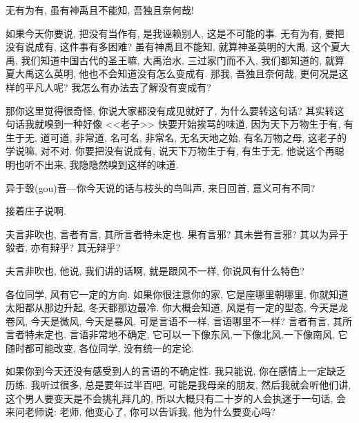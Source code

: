 \documentclass[11pt]{article}
\begin{document}
\newpage 

{\begin{center}
		{\color{green} 无有为有, 虽有神禹且不能知, 吾独且奈何哉!}
\end{center}}

\vspace{-0.5cm}

如果今天你要说, 把没有当作有, 是我诬赖别人, 这是不可能的事. {\color{blue} 无有为有,} 要把没有说成有, 这件事有多困难? {\color{blue} 虽有神禹且不能知},  就算神圣英明的大禹, 这个夏大禹, 我们知道中国古代的圣王嘛, 大禹治水, 三过家门而不入, 我们都知道的, 就算夏大禹这么英明, 他也不会知道没有怎么变成有. 那我, {\color{blue} 吾独且奈何哉}, 更何况是这样的平凡人呢? 我怎么有办法去了解没有变成有?

那你这里觉得很奇怪, 你说大家都没有成见就好了, 为什么要转这句话? 其实转这句话我就嗅到一种好像 <<老子>> 快要开始挨骂的味道, 因为天下万物生于有, 有生于无, 道可道, 非常道, 名可名, 非常名, 无名天地之始, 有名万物之母, 这老子的学说嘛, 对不对. 你要把没有说成有, 说天下万物生于有, 有生于无, 他说这个再聪明也听不出来, 我隐隐然嗅到这样的味道. 

\vspace{0.25cm}

{\Large \color{purple} 异于彀(gou)音---你今天说的话与枝头的鸟叫声, 来日回首, 意义可有不同? }

\vspace{-0.25cm}

接着庄子说啊.

\vspace{-0.25cm}

{\begin{center}
		{\color{green} 夫言非吹也, 言者有言, 其所言者特未定也. 果有言邪? 其未尝有言邪? 其以为异于彀者, 亦有辩乎? 其无辩乎? }
\end{center}}

\vspace{-0.5cm}

{\color{blue} 夫言非吹也}, 他说, 我们讲的话啊, 就是跟风不一样, 你说风有什么特色?    

各位同学, 风有它一定的方向. 如果你很注意你的家, 它是座哪里朝哪里, 你就知道太阳都从那边升起, 冬天都那边最冷. 你大概会知道, 风是有一定的型态, 今天是龙卷风, 今天是微风, 今天是暴风, 可是言语不一样, 言语哪里不一样? {\color{blue} 言者有言, 其所言者特未定也.} 言语非常地不确定, 它可以一下像东风,一下像北风,一下像南风, 它随时都可能改变, 各位同学, 没有统一的定论.

如果你到今天还没有感受到人的言语的不确定性. 我只能说, 你在感情上一定缺乏历练. 我听过很多, 总是要年过半百吧, 可能是我母亲的朋友, 然后我就会听他们讲, 这个男人要变天是不会挑礼拜几的, 所以大概只有二十岁的人会执迷于一句话, 会来问老师说: 老师, 他变心了, 你可以告诉我, 他为什么要变心吗? 
\end{document}
